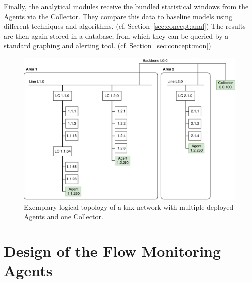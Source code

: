 Finally, the analytical modules receive the bundled statistical windows from the Agents via the Collector. They compare this data to baseline models using different techniques and algorithms. (cf. Section~\ref{sec:concept:anal})
The results are then again stored in a database, from which they can be queried by a standard graphing and alerting tool. (cf. Section~\ref{sec:concept:mon})

\begin{figure}
	\centering
	\includegraphics[width=\textwidth]{figures/500-knx-demo-topo-with-agents.pdf}
	\caption[KNX network topology with Agents and Collector]{Exemplary logical topology of a \gls{knx} network with multiple deployed Agents and one Collector.}
	\label{fig:concept:network}
\end{figure}

\section{Design of the Flow Monitoring Agents}
\label{sec:concept:agent}

